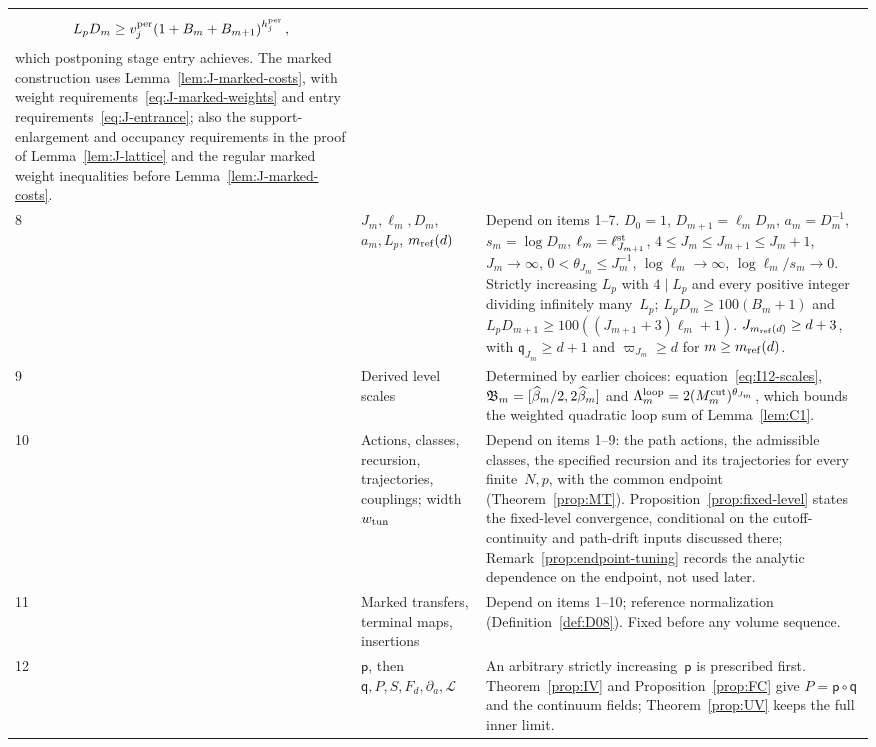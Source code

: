 \begin{longtable}{@{}p{}p{}p{}@{}}
\begin{equation*}
L_pD_m\ge v_j^{\rm per}(1+B_m+B_{m+1})^{h_j^{\rm per}}\,,
\end{equation*}
which postponing stage entry achieves. The marked construction uses Lemma~\ref{lem:J-marked-costs}, with weight requirements~\eqref{eq:J-marked-weights} and entry requirements~\eqref{eq:J-entrance}; also the support-enlargement and occupancy requirements in the proof of Lemma~\ref{lem:J-lattice} and the regular marked weight inequalities before Lemma~\ref{lem:J-marked-costs}.\\[3pt]
8 & \raggedright $J_m,\ell_m,D_m$, $a_m,L_p$, $m_{\mathrm{ref}}(d)$ & Depend on items 1--7. $D_0=1$, $D_{m+1}=\ell_mD_m$, $a_m=D_m^{-1}$, $s_m=\log D_m$, $\ell_m=\ell^{\rm st}_{J_{m+1}}$, $4\le J_m\le J_{m+1}\le J_m+1$, $J_m\to\infty$, $0<\theta_{J_m}\le J_m^{-1}$, $\log\ell_m\to\infty$, $\log\ell_m/s_m\to0$. Strictly increasing $L_p$ with $4\mid L_p$ and every positive integer dividing infinitely many~$L_p$; $L_pD_m\ge100(B_m+1)$ and $L_pD_{m+1}\ge100((J_{m+1}+3)\ell_m+1)$. $J_{m_{\mathrm{ref}}(d)}\ge d+3$, with $\mathfrak q_{J_m}\ge d+1$ and $\varpi_{J_m}\ge d$ for $m\ge m_{\mathrm{ref}}(d)$.\\[3pt]
9 & \raggedright Derived level scales & Determined by earlier choices: equation~\eqref{eq:I12-scales}, $\mathfrak B_m=[\widehat{\beta}_m/2,2\widehat{\beta}_m]$ and $\Lambda_m^{\rm loop}=2(M^{\mathrm{cut}}_m)^{\theta_{J_m}}$, which bounds the weighted quadratic loop sum of Lemma~\ref{lem:C1}.\\[3pt]
10 & \raggedright Actions, classes, recursion, trajectories, couplings; width~$w_{\rm tun}$ & Depend on items 1--9: the path actions, the admissible classes, the specified recursion and its trajectories for every finite~$N,p$, with the common endpoint (Theorem~\ref{prop:MT}). Proposition~\ref{prop:fixed-level} states the fixed-level convergence, conditional on the cutoff-continuity and path-drift inputs discussed there; Remark~\ref{prop:endpoint-tuning} records the analytic dependence on the endpoint, not used later.\\[3pt]
11 & \raggedright Marked transfers, terminal maps, insertions & Depend on items 1--10; reference normalization (Definition~\ref{def:D08}). Fixed before any volume sequence.\\[3pt]
12 & \raggedright $\mathsf p$, then $\mathsf q,P,S,F_d,\partial_a,\mathcal L$ & An arbitrary strictly increasing~$\mathsf p$ is prescribed first. Theorem~\ref{prop:IV} and Proposition~\ref{prop:FC} give $P=\mathsf p\circ\mathsf q$ and the continuum fields; Theorem~\ref{prop:UV} keeps the full inner limit.\\[3pt]

\end{longtable}
